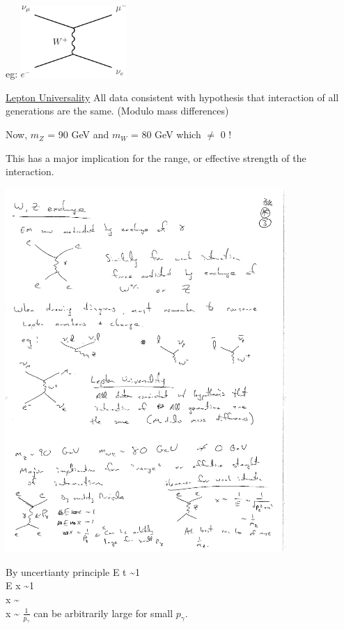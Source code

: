 {eg:
\bc
\includegraphics[width=0.3\textwidth]{./NuScattering.pdf}   
\ec

\underline{Lepton Universality}
All data consistent with hypothesis that interaction of all generations are the same.
(Modulo mass differences)

\clearpage


\bc
Now, $m_Z$ = 90 GeV and $m_W$ = 80 GeV  which $\ne$ 0 !
\ec

This has a major implication for the range, or effective strength of the interaction.


\begin{minipage}{0.4\textwidth}
\includegraphics[width=0.8\textwidth]{./eeGamma.pdf}   
\end{minipage} %
\begin{minipage}{0.45\textwidth}
By uncertianty principle 
\bea
E \times t \sim 1 \\
E \times x \sim 1 \\
x \sim {} \\ 
x \sim {}
\eea
$\frac{1}{p_\gamma}$ can be arbitrarily large for small $p_\gamma$.
\end{minipage} %



}
